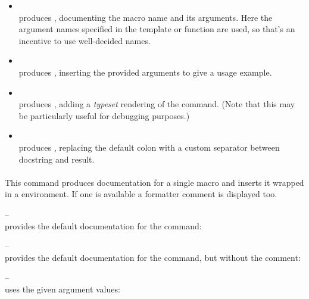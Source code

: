 \documentclass[12pt]{scrartcl}
\begin{document}
\begin{itemize}
\item \texttt{}\\
produces , documenting the macro name and its
arguments.  Here the argument names specified in the template or function are
used, so that's an incentive to use well-decided names.
\item \texttt{}\\
produces , inserting
the provided arguments to give a usage example.
\item \texttt{}\\
produces ,
adding a \emph{typeset} rendering of the command. (Note that this may be
particularly useful for debugging purposes.)
\item \texttt{}\\
produces , replacing the default colon with a custom separator between docstring and result.
\end{itemize}


\paragraph{\texttt{}}

This command produces documentation for a single macro and inserts it wrapped in a  environment.  If one is available a formatter comment is displayed too.

\medskip
\noindent \texttt{} --\\
provides the default documentation for the command:


\medskip
\noindent \texttt{} --\\
provides the default documentation for the command, but without the comment:


\medskip
\noindent \texttt{} --\\
uses the given argument values:
\end{document}
